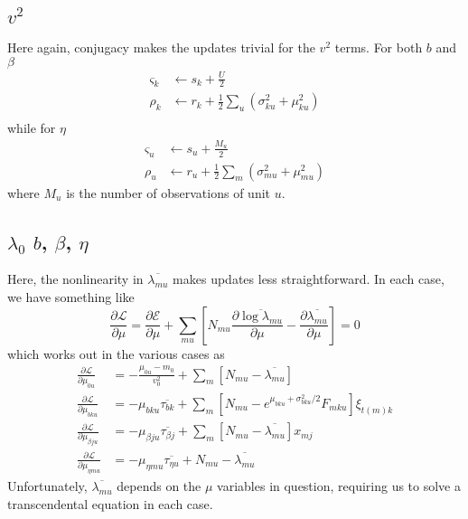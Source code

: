\documentclass[11pt]{article}
\begin{document}
\subsection{$v^2$}
Here again, conjugacy makes the updates trivial for the $v^2$ terms. For both $b$ and $\beta$
\begin{align}
    \varsigma_k &\leftarrow s_k + \frac{U}{2} \\
    \rho_k &\leftarrow r_k + \frac{1}{2}\sum_u (\sigma^2_{ku} + \mu^2_{ku}) \\
\end{align}
while for $\eta$
\begin{align}
    \varsigma_u &\leftarrow s_u + \frac{M_u}{2} \\
    \rho_u &\leftarrow r_u + \frac{1}{2} \sum_m (\sigma^2_{mu} + \mu^2_{mu})
\end{align}
where $M_u$ is the number of observations of unit $u$.

\subsection{$\lambda_0$ $b$, $\beta$, $\eta$}
Here, the nonlinearity in $\overline{\lambda_{mu}}$ makes updates less straightforward. In each case, we have something like
\begin{equation}
    \frac{\partial\mathcal{L}}{\partial \mu} = \frac{\partial\mathcal{E}}{\partial \mu} + \sum_{mu} \left[N_{mu} \frac{\partial\overline{\log \lambda_{mu}}}{\partial \mu} - \frac{\partial\overline{\lambda_{mu}}}{\partial \mu}\right] = 0
\end{equation}
which works out in the various cases as
\begin{align}
    \frac{\partial\mathcal{L}}{\partial \mu_{0u}} &= -\frac{\mu_{0u} - m_0}{v_0^2} + \sum_m [N_{mu} - \overline{\lambda_{mu}}] \\
    \frac{\partial\mathcal{L}}{\partial \mu_{bku}} &= 
    - \mu_{bku} \overline{\tau_{bk}} + \sum_m [N_{mu} - e^{\mu_{bku} + \sigma^2_{bku} / 2} F_{mku} ] \xi_{t(m) k} \\
    \frac{\partial\mathcal{L}}{\partial \mu_{\beta ju}} &= 
    - \mu_{\beta ju} \overline{\tau_{\beta j}} + \sum_m [N_{mu} - \overline{\lambda_{mu}}] x_{mj}  \\
    \frac{\partial\mathcal{L}}{\partial \mu_{\eta mu}} &= 
    - \mu_{\eta mu} \overline{\tau_{\eta u}} + N_{mu} - 
    \overline{\lambda_{mu}}
\end{align}
Unfortunately, $\overline{\lambda_{mu}}$ depends on the $\mu$ variables in question, requiring us to solve a transcendental equation in each case.
\end{document}
